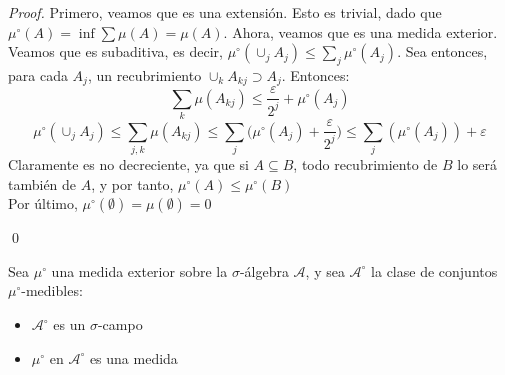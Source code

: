 \begin{proof}
Primero, veamos que es una extensión. Esto es trivial, dado que $\mu^\circ(A) = \inf \displaystyle \sum \mu(A) = \mu(A)$. Ahora, veamos que es una medida exterior.\\

Veamos que es subaditiva, es decir, $\mu^\circ(\displaystyle \cup_j A_j) \leq \sum_j \mu^\circ(A_j)$. Sea entonces, para cada $A_j$, un recubrimiento $ \displaystyle \cup_k A_{kj} \supset A_j$. Entonces:
$$ \sum_k \mu (A_{kj}) \leq \frac{\varepsilon}{2^j} + \mu^\circ (A_j)$$
$$ \mu^\circ (\cup_j A_j) \leq \sum_{j,k} \mu (A_{kj}) \leq \sum_j \Big( \mu^\circ(A_j) + \frac{\varepsilon}{2^j}\Big) \leq \sum_j (\mu^\circ(A_j)) + \varepsilon $$
Claramente es no decreciente, ya que si $A \subseteq B$, todo recubrimiento de $B$ lo será también de $A$, y por tanto, $\mu^\circ(A) \leq \mu^\circ(B)$\\

Por último, $\mu^\circ(\emptyset) = \mu(\emptyset) = 0$

\qed
\end{proof}

\begin{theorem}
Sea $\mu^\circ$ una medida exterior sobre la $\sigma$-álgebra $\mathcal{A}$, y sea $\mathcal{A}^\circ$ la clase de conjuntos $\mu^\circ$-medibles:
\begin{itemize}
\item $\mathcal{A}^\circ$ es un $\sigma$-campo
\item $\mu^\circ$ en $\mathcal{A}^\circ$ es una medida
\end{itemize}
\end{theorem}

